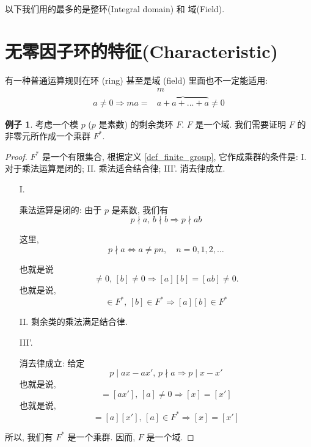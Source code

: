 \documentclass[utf8]{ctexbook}
\theoremstyle{definition}
\newtheorem{example}{例子}[section]
\begin{document}
以下我们用的最多的是整环(Integral domain) 和 域(Field).

\section{无零因子环的特征(Characteristic)}


有一种普通运算规则在环 (ring) 甚至是域 (field) 里面也不一定能适用:
\begin{equation}\label{eq_power_non_zero}
\begin{array}{cc}
 & m \\ 
a \neq 0 \Rightarrow  m a  = & \overbrace{a + a + ... + a} \neq 0 
\end{array}
\end{equation}

\begin{example}\label{example_mod_prime_number_field}
考虑一个模 $p$ ($p$ 是素数) 的剩余类环 $F$. $F$ 是一个域.
我们需要证明 $F$ 的非零元所作成一个乘群 $F^*$.

\end{example}

\begin{proof}
$F^*$ 是一个有限集合, 根据定义 \ref{def_finite_group}, 它作成乘群的条件是: I. 对于乘法运算是闭的; II. 乘法适合结合律; III'. 消去律成立.
\begin{itemize}
\item[I.]{乘法运算是闭的: 由于 $p$ 是素数, 我们有
\begin{equation}
p \nmid a, \, b \nmid b \Rightarrow p \nmid ab
\end{equation}

这里,
\begin{equation}
p \nmid a \iff a \neq p n, \quad n = 0, 1, 2, \ldots
\end{equation}

也就是说
\begin{equation}
[a] \neq 0, \, [b] \neq 0 \Rightarrow [a][b] = [ab] \neq 0 .
\end{equation}
也就是说,
\begin{equation}
[a] \in F^*, \, [b] \in F^* \Rightarrow [a] [b] \in F^*
\end{equation}
}
\item[II.]{剩余类的乘法满足结合律.}
\item[III'.]{消去律成立: 给定
\begin{equation}
p \mid ax - a x' , \, p \nmid a \Rightarrow p \mid x - x' 
\end{equation}
也就是说,
\begin{equation}
[ax] = [ax'] , \, [a] \neq 0 \Rightarrow [x] = [x']
\end{equation}
也就是说,
\begin{equation}
[a][x] = [a] [x'] , \, [a] \in F^* \Rightarrow [x] = [x']
\end{equation}

}
\end{itemize}

所以, 我们有 $F^*$ 是一个乘群. 因而, $F$ 是一个域.
\end{proof}
\end{document}
